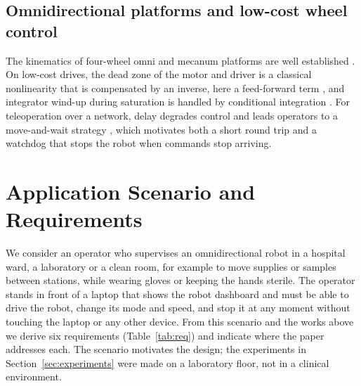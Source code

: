 \documentclass[5p,twocolumn]{elsarticle}
\begin{document}
\subsection{Omnidirectional platforms and low-cost wheel control}
The kinematics of four-wheel omni and mecanum platforms are well established \cite{siegwart2011,lynch2017,taheri2015}. On low-cost drives, the dead zone of the motor and driver is a classical nonlinearity that is compensated by an inverse, here a feed-forward term \cite{tao1996}, and integrator wind-up during saturation is handled by conditional integration \cite{astrom2006}. For teleoperation over a network, delay degrades control and leads operators to a move-and-wait strategy \cite{ferrell1965,lane2002}, which motivates both a short round trip and a watchdog that stops the robot when commands stop arriving.

\section{Application Scenario and Requirements}\label{sec:application}
We consider an operator who supervises an omnidirectional robot in a hospital ward, a laboratory or a clean room, for example to move supplies or samples between stations, while wearing gloves or keeping the hands sterile. The operator stands in front of a laptop that shows the robot dashboard and must be able to drive the robot, change its mode and speed, and stop it at any moment without touching the laptop or any other device. From this scenario and the works above we derive six requirements (Table~\ref{tab:req}) and indicate where the paper addresses each. The scenario motivates the design; the experiments in Section~\ref{sec:experiments} were made on a laboratory floor, not in a clinical environment.
\end{document}
